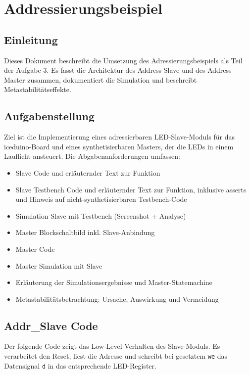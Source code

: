 \section{Addressierungsbeispiel}

\subsection{Einleitung}
Dieses Dokument beschreibt die Umsetzung des Adressierungsbeispiels als Teil der Aufgabe 3. Es fasst die Architektur des Address-Slave und des Address-Master zusammen, dokumentiert die Simulation und beschreibt Metastabilitätseffekte.

\subsection{Aufgabenstellung}
Ziel ist die Implementierung eines adressierbaren LED-Slave-Moduls für das iceduino-Board und eines synthetisierbaren Masters, der die LEDs in einem Lauflicht ansteuert. Die Abgabenanforderungen umfassen:

\begin{itemize}
  \item Slave Code und erläuternder Text zur Funktion
  \item Slave Testbench Code und erläuternder Text zur Funktion, inklusive asserts und Hinweis auf nicht-synthetisierbaren Testbench-Code
  \item Simulation Slave mit Testbench (Screenshot + Analyse)
  \item Master Blockschaltbild inkl. Slave-Anbindung
  \item Master Code
  \item Master Simulation mit Slave
  \item Erläuterung der Simulationsergebnisse und Master-Statemachine
  \item Metastabilitätsbetrachtung: Ursache, Auswirkung und Vermeidung
\end{itemize}

\newpage
\subsection{Addr\_Slave Code}
Der folgende Code zeigt das Low-Level-Verhalten des Slave-Moduls. Es verarbeitet den Reset, liest die Adresse und schreibt bei gesetztem \texttt{we} das Datensignal \texttt{d} in das entsprechende LED-Register.

